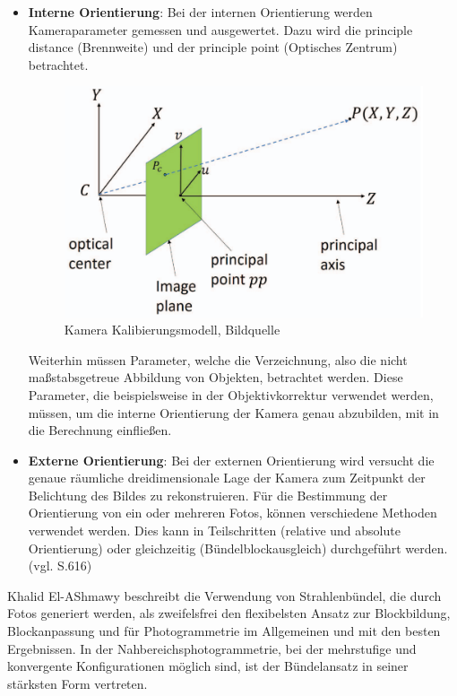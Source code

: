 \begin{itemize}
\item \textbf{Interne Orientierung}: Bei der internen Orientierung werden Kameraparameter gemessen und ausgewertet. Dazu wird die \glqq principle distance\grqq{} (Brennweite) und der \glqq principle point\grqq{} (Optisches Zentrum) betrachtet.

\begin{figure}[H]
	\centering
	\includegraphics[scale=0.45]{pp.png}
	\caption{Kamera Kalibierungsmodell, Bildquelle \cite{pp}}
\end{figure} 

Weiterhin müssen Parameter, welche die Verzeichnung, also die nicht maßstabsgetreue Abbildung von Objekten, betrachtet werden. Diese Parameter, die beispielsweise in der Objektivkorrektur verwendet werden, müssen, um die interne Orientierung der Kamera genau abzubilden, mit in die Berechnung einfließen.

\item \textbf{Externe Orientierung}: Bei der externen Orientierung wird versucht die genaue räumliche dreidimensionale Lage der Kamera zum Zeitpunkt der Belichtung des Bildes zu rekonstruieren. Für die Bestimmung der Orientierung von ein oder mehreren Fotos, können verschiedene Methoden verwendet werden. Dies kann in Teilschritten (relative und absolute Orientierung) oder gleichzeitig (Bündelblockausgleich) durchgeführt werden. (vgl. \cite{exterior_review} S.616)
\end{itemize}

Khalid El-AShmawy \cite{comparative_conditions_study} beschreibt die Verwendung von Strahlenbündel, die durch Fotos generiert werden, als zweifelsfrei den flexibelsten Ansatz zur Blockbildung, Blockanpassung und für Photogrammetrie im Allgemeinen und mit den besten Ergebnissen. In der Nahbereichsphotogrammetrie, bei der mehrstufige und konvergente Konfigurationen möglich sind, ist der Bündelansatz in seiner stärksten Form vertreten. 


